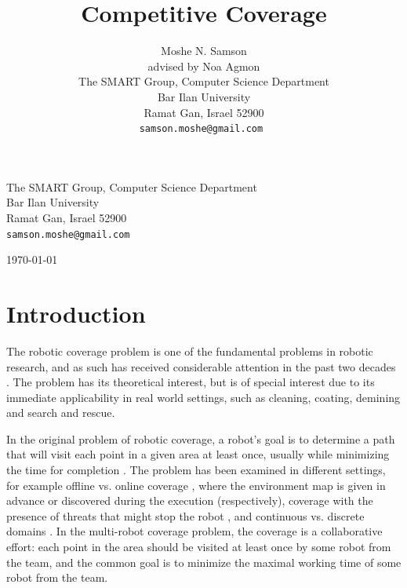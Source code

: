 \documentclass[a4paper,english,10pt]{article}
\begin{document}
\begin{titlepage}
\begin{center}
\vfill


\large{The SMART Group, Computer Science Department\\
Bar Ilan University\\
Ramat Gan, Israel 52900\\
\tt\small samson.moshe@gmail.com}

\vfill

\today

\end{center}
\end{titlepage}

\title{Competitive Coverage}
\author{Moshe N. Samson\\
advised by Noa Agmon\\
The SMART Group, Computer Science Department\\
Bar Ilan University\\
Ramat Gan, Israel 52900\\
\tt\small samson.moshe@gmail.com
}

\tableofcontents
\maketitle

\section{Introduction}
The robotic coverage problem is one of the fundamental problems in robotic research, and as such has received considerable attention in the past two decades \cite{galceran2013survey}. The problem has its theoretical interest, but is of special interest due to its immediate applicability in real world settings, such as cleaning, coating, demining and search and rescue. 

In the original problem of robotic coverage, a robot's goal is to determine a path that will visit each point in a given area at least once, usually while minimizing the time for completion \cite{galceran2013survey}. The problem has been examined in different settings, for example offline vs. online coverage \cite{gabriely2001spanning,agmon2008giving}, where the environment map is given in advance or discovered during the execution (respectively), coverage with the presence of threats that might stop the robot \cite{yehoshua2014safest}, and continuous vs. discrete domains \cite{gabriely2001spanning,yang2004neural}. In the multi-robot coverage problem, the coverage is a collaborative effort: each point in the area should be visited at least once by some robot from the team, and the common goal is to minimize the maximal working time of some robot from the team. 
\end{document}
